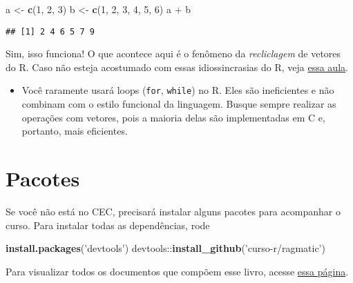 \documentclass[]{book}
\newenvironment{Shaded}{\begin{snugshade}}{\end{snugshade}}
\newcommand{\KeywordTok}[1]{\textcolor[rgb]{0.13,0.29,0.53}{\textbf{{#1}}}}
\newcommand{\DecValTok}[1]{\textcolor[rgb]{0.00,0.00,0.81}{{#1}}}
\newcommand{\StringTok}[1]{\textcolor[rgb]{0.31,0.60,0.02}{{#1}}}
\newcommand{\NormalTok}[1]{{#1}}
\providecommand{\tightlist}{%
  \setlength{\itemsep}{0pt}\setlength{\parskip}{0pt}}
\begin{document}
\begin{Shaded}
\begin{Highlighting}[]
\NormalTok{a <-}\StringTok{ }\KeywordTok{c}\NormalTok{(}\DecValTok{1}\NormalTok{, }\DecValTok{2}\NormalTok{, }\DecValTok{3}\NormalTok{)}
\NormalTok{b <-}\StringTok{ }\KeywordTok{c}\NormalTok{(}\DecValTok{1}\NormalTok{, }\DecValTok{2}\NormalTok{, }\DecValTok{3}\NormalTok{, }\DecValTok{4}\NormalTok{, }\DecValTok{5}\NormalTok{, }\DecValTok{6}\NormalTok{)}
\NormalTok{a +}\StringTok{ }\NormalTok{b }
\end{Highlighting}
\end{Shaded}

\begin{verbatim}
## [1] 2 4 6 5 7 9
\end{verbatim}

Sim, isso funciona! O que acontece aqui é o fenômeno da
\emph{recliclagem} de vetores do R. Caso não esteja acostumado com essas
idiossincrasias do R, veja
\href{http://curso-r.github.io/posts/aula01.html}{essa aula}.

\begin{itemize}
\tightlist
\item
  Você raramente usará loops (\texttt{for}, \texttt{while}) no R. Eles
  são ineficientes e não combinam com o estilo funcional da linguagem.
  Busque sempre realizar as operações com vetores, pois a maioria delas
  são implementadas em C e, portanto, mais eficientes.
\end{itemize}

\section{Pacotes}\label{pacotes}

Se você não está no CEC, precisará instalar alguns pacotes para
acompanhar o curso. Para instalar todas as dependências, rode

\begin{Shaded}
\begin{Highlighting}[]
\KeywordTok{install.packages}\NormalTok{(}\StringTok{'devtools'}\NormalTok{)}
\NormalTok{devtools::}\KeywordTok{install_github}\NormalTok{(}\StringTok{'curso-r/ragmatic'}\NormalTok{)}
\end{Highlighting}
\end{Shaded}

Para visualizar todos os documentos que compõem esse livro, acesse
\href{https://github.com/curso-r/ragmatic-book}{essa página}.
\end{document}
